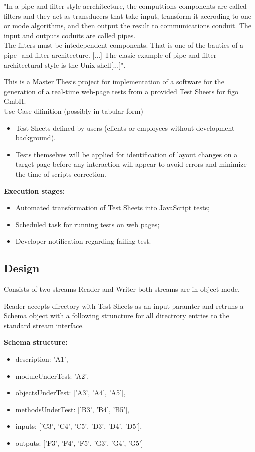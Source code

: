 \documentclass{llncs}
\begin{document}
"In a pipe-and-filter style acrchitecture, the computtions components are called filters and they act as transducers that take input, transform it accroding to one or mode algorithms, and then output the result to communications conduit. The input and outputs coduits are called pipes.\\
The filters must be intedependent components. That is one of the bauties of a pipe -and-filter architecture. [...] The clasic example of pipe-and-filter architectural style is the Unix shell[...]"\cite{Dooley}.


This is a Master Thesis project for implementation of a software for the generation of a real-time web-page tests from a provided Test Sheets for figo GmbH.\\

 Use Case difinition (possibly in tabular form)


\begin{itemize}
\item Test Sheets defined by users (clients or employees without development background).
\item Tests themselves will be applied for identification of layout changes on a target page before any interaction will appear to avoid errors and minimize the time of scripts correction.
\end{itemize}
 
\textbf{Execution stages:}
\begin{itemize}
\item Automated transformation of Test Sheets into JavaScript tests;
\item Scheduled task for running tests on web pages;
\item Developer notification regarding failing test.
\end{itemize}



\subsection{Design}
Consists of two streams Reader and Writer both streams are in object mode.

Reader accepts directory with  Test Sheets as an input paramter and retruns a Schema object with a following struncture for all directrory entries to the standard stream interface.

\textbf{Schema structure:}
\begin{itemize}
\item description: 'A1',
\item moduleUnderTest: 'A2',
\item objectsUnderTest: ['A3', 'A4', 'A5'],
\item methodsUnderTest: ['B3', 'B4', 'B5'],
\item inputs: ['C3', 'C4', 'C5', 'D3', 'D4', 'D5'],
\item outputs: ['F3', 'F4', 'F5', 'G3', 'G4', 'G5']
\end{itemize}
\end{document}
